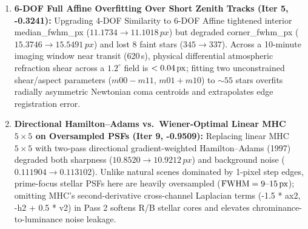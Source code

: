 \documentclass[10pt,twocolumn,letterpaper]{article}
\DeclareRobustCommand{\code}[1]{\texttt{#1}}
\def\code#1{#1}%
\begin{document}
\begin{enumerate}
  \item \textbf{6-DOF Full Affine Overfitting Over Short Zenith Tracks (\code{Iter 5}, \code{-0.3241}):}
  Upgrading 4-DOF Similarity to 6-DOF Affine tightened interior \code{median\_fwhm\_px} ($\code{11.1734} \to \code{11.1018\,px}$) but degraded \code{corner\_fwhm\_px} ($\code{15.3746} \to \code{15.5491\,px}$) and lost 8 faint stars ($\code{345} \to \code{337}$). Across a 10-minute imaging window near transit (\code{620\,s}), physical differential atmospheric refraction shear across a $1.2^\circ$ field is $<0.04\text{\,px}$; fitting two unconstrained shear/aspect parameters ($\code{m00} - \code{m11}$, $\code{m01} + \code{m10}$) to $\sim 55$ stars overfits radially asymmetric Newtonian coma centroids and extrapolates edge registration error.

  \item \textbf{Directional Hamilton--Adams vs.\ Wiener-Optimal Linear MHC $5\times 5$ on Oversampled PSFs (\code{Iter 9}, \code{-0.9509}):}
  Replacing linear MHC $5\times 5$ with two-pass directional gradient-weighted Hamilton--Adams (1997)~\cite{hamilton1997adaptive} degraded both sharpness ($\code{10.8520} \to \code{10.9212\,px}$) and background noise ($\code{0.111904} \to \code{0.113102}$). Unlike natural scenes dominated by 1-pixel step edges, prime-focus stellar PSFs here are heavily oversampled ($\text{FWHM} = 9\text{--}15\text{\,px}$); omitting MHC's second-derivative cross-channel Laplacian terms (\code{-1.5 * ax2}, \code{-h2 + 0.5 * v2}) in Pass 2 softens R/B stellar cores and elevates chrominance-to-luminance noise leakage.
\end{enumerate}
\end{document}
